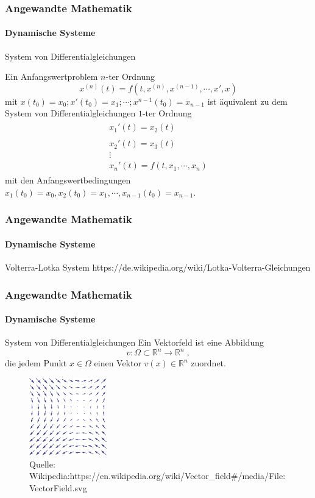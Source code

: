 \documentclass{beamer}
\begin{document}
\begin{frame}
    \frametitle{Angewandte Mathematik}
\framesubtitle{Dynamische Systeme }
\begin{block}{System von Differentialgleichungen}

Ein Anfangswertproblem $n$-ter Ordnung
 $$ x^{(n)}(t) = f(t, x^{(n)}, x^{(n-1)} , \cdots , x', x) $$ mit  $x(t_0) = x_0 ; x'(t_0) = x_1; \cdots ; x^{n-1}(t_{0})= x_{n-1}  $ ist äquivalent zu dem System von   Differentialgleichungen $1$-ter Ordnung
\begin{align*}
\begin{matrix} x_1'(t) = x_2(t) \\  \\ x_2'(t) = x_3(t) \\  \vdots  \\ x_n'(t) = f(t, x_1, \cdots, x_n )\end{matrix}
\end{align*}
mit den Anfangswertbedingungen  $x_1(t_0) = x_0 , x_2(t_0) = x_1, \cdots , x_{n-1}(t_{0})= x_{n-1} $.
\end{block}


 \end{frame}

\begin{frame}
    \frametitle{Angewandte Mathematik}
\framesubtitle{Dynamische Systeme }

\begin{block}{Volterra-Lotka System}
https://de.wikipedia.org/wiki/Lotka-Volterra-Gleichungen
\end{block}
 \end{frame}


\begin{frame}
    \frametitle{Angewandte Mathematik}
\framesubtitle{Dynamische Systeme }
\begin{block}{System von Differentialgleichungen}
Ein Vektorfeld ist eine Abbildung $$v : \Omega \subset \mathbb{R}^n \to \mathbb{R}^n \; ,$$ die jedem Punkt $x  \in \Omega$ einen Vektor $v(x) \in \mathbb{R}^n$ zuordnet.
\end{block}
\begin{figure}[H]
      \centering
    \includegraphics[width=0.3\textwidth]{images/480px-VectorField.png}
\caption{Quelle: Wikipedia:https://en.wikipedia.org/wiki/Vector\_field\#/media/File:VectorField.svg}
\end{figure}

 \end{frame}
\end{document}
